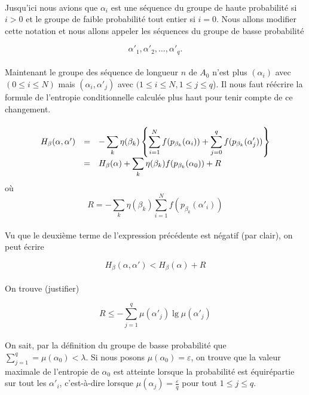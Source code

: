 	\paragraph{}
	Jusqu'ici nous avions que $\alpha_i$ est une séquence du groupe de haute 
	probabilité si $i>0$ et le groupe de faible probabilité tout entier si 
	$i=0$. Nous allons modifier cette notation et nous allons appeler les 
	séquences du groupe de basse probabilité 
	
	\[\alpha'_1, \alpha'_2, \dots, \alpha'_q.\]
	
	\paragraph{}
	Maintenant le groupe des séquence de longueur $n$ de $A_0$ n'est plus 
	$(\alpha_i)$ avec $(0 \le i \le N)$ mais $(\alpha_i, \alpha'_j)$ avec 
	$(1\le i \le N, 1 \le j \le q$). Il nous faut réécrire la formule de
	 l'entropie conditionnelle calculée plus haut pour tenir compte de ce
	 changement.
	
	\paragraph{}
	\[
		\begin{array}{r c >{\displaystyle}l}
			H_\beta(\alpha,\alpha') &=& 
				- \sum_k\eta(\beta_k)\left\{
					\sum_{i=1}^Nf(p_{\beta_k}(\alpha_i))+
					\sum_{j=0}^qf(p_{\beta_k}(\alpha'_j))
				\right\}\\
			&=& H_\beta(\alpha) + 
				\sum_k\eta(\beta_k)f(p_{\beta_k}(\alpha_0))+R
		\end{array}
	\]
	où
	\[R=- \sum_k\eta(\beta_k)\sum_{i=1}^Nf(p_{\beta_k}(\alpha'_i))\]
	
	\paragraph{}
	Vu que le deuxième terme de l'expression précédente est négatif 
	(par clair), on peut écrire
	
	\[H_\beta(\alpha,\alpha') < H_\beta(\alpha) + R\]
	
	\paragraph{}
	On trouve (justifier)
	
	\[R \le -\sum_{j=1}^q\mu(\alpha'_j)\lg\mu(\alpha'_j)\]
	
	\paragraph{}
	On sait, par la définition du groupe de basse probabilité que 
	$\sum_{j=1}^q =\mu(\alpha_0) < \lambda$. Si nous posons 
	$\mu(\alpha_0)=\varepsilon$, on trouve que la valeur maximale 
	de l'entropie de $\alpha_0$ est atteinte lorsque la probabilité 
	est équirépartie sur tout les $\alpha'_i$, c'est-à-dire lorsque
	 $\mu(\alpha_j)=\frac{\varepsilon}{q}$ pour tout $1\le j\le q$.
	
